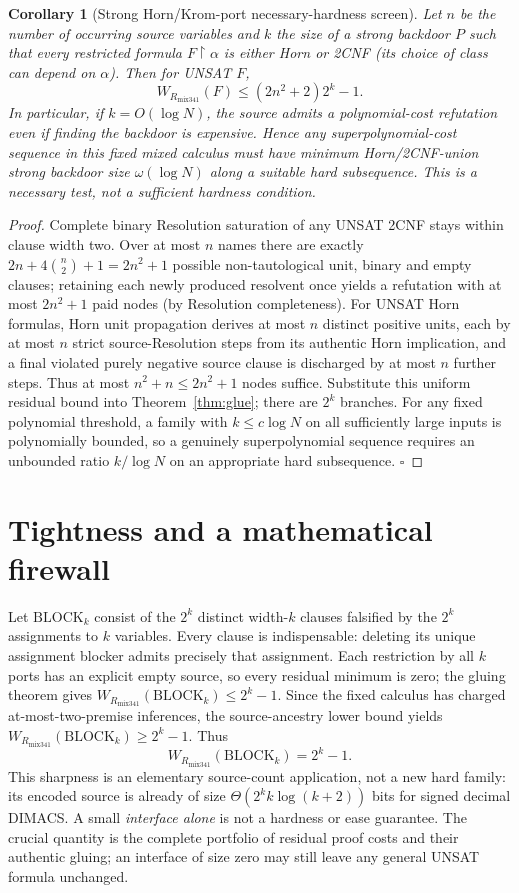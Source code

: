 \documentclass[11pt]{article}
\newtheorem{corollary}[theorem]{Corollary}
\begin{document}
\begin{corollary}[Strong Horn/Krom-port necessary-hardness screen]
Let $n$ be the number of occurring source variables and $k$ the size of a \emph{strong} backdoor $P$ such that every restricted formula $F\upharpoonright\alpha$ is either Horn or 2CNF (its choice of class can depend on $\alpha$). Then for UNSAT $F$,
\[
\boxed{W_{R_{\mathrm{mix341}}}(F)\le(2n^2+2)2^k-1.}
\]
In particular, if $k=O(\log N)$, the source admits a polynomial-cost refutation even if finding the backdoor is expensive. Hence any superpolynomial-cost sequence in this fixed mixed calculus must have minimum Horn/2CNF-union strong backdoor size $\omega(\log N)$ along a suitable hard subsequence. This is a necessary test, not a sufficient hardness condition.
\end{corollary}
\begin{proof}
Complete binary Resolution saturation of any UNSAT 2CNF stays within clause width two. Over at most $n$ names there are exactly $2n+4\binom n2+1=2n^2+1$ possible non-tautological unit, binary and empty clauses; retaining each newly produced resolvent once yields a refutation with at most $2n^2+1$ paid nodes (by Resolution completeness). For UNSAT Horn formulas, Horn unit propagation derives at most $n$ distinct positive units, each by at most $n$ strict source-Resolution steps from its authentic Horn implication, and a final violated purely negative source clause is discharged by at most $n$ further steps. Thus at most $n^2+n\le2n^2+1$ nodes suffice. Substitute this uniform residual bound into Theorem~\ref{thm:glue}; there are $2^k$ branches. For any fixed polynomial threshold, a family with $k\le c\log N$ on all sufficiently large inputs is polynomially bounded, so a genuinely superpolynomial sequence requires an unbounded ratio $k/\log N$ on an appropriate hard subsequence. \hfill$\square$
\end{proof}

\section*{Tightness and a mathematical firewall}
Let $\mathrm{BLOCK}_k$ consist of the $2^k$ distinct width-$k$ clauses falsified by the $2^k$ assignments to $k$ variables. Every clause is indispensable: deleting its unique assignment blocker admits precisely that assignment. Each restriction by all $k$ ports has an explicit empty source, so every residual minimum is zero; the gluing theorem gives $W_{R_{\mathrm{mix341}}}(\mathrm{BLOCK}_k)\le2^k-1$. Since the fixed calculus has charged at-most-two-premise inferences, the source-ancestry lower bound yields $W_{R_{\mathrm{mix341}}}(\mathrm{BLOCK}_k)\ge2^k-1$. Thus
\[
\boxed{W_{R_{\mathrm{mix341}}}(\mathrm{BLOCK}_k)=2^k-1.}
\]
This sharpness is an elementary source-count application, not a new hard family: its encoded source is already of size $\Theta(2^k k\log(k+2))$ bits for signed decimal DIMACS. A small \emph{interface alone} is not a hardness or ease guarantee. The crucial quantity is the complete portfolio of residual proof costs and their authentic gluing; an interface of size zero may still leave any general UNSAT formula unchanged.
\end{document}
